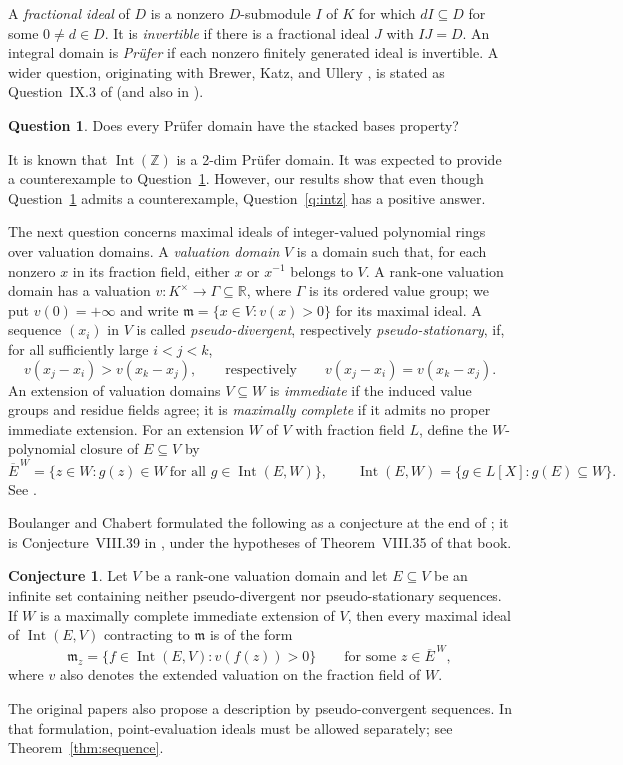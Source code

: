 \documentclass[11pt]{amsart}
\theoremstyle{definition}
\newtheorem{question}[theorem]{Question}
\newtheorem{conjecture}[theorem]{Conjecture}
\theoremstyle{remark}
\newcommand{\Int}{\operatorname{Int}}
\begin{document}
A \emph{fractional ideal} of $D$ is a nonzero $D$-submodule $I$ of $K$
for which $dI\subseteq D$ for some $0\ne d\in D$. It is
\emph{invertible} if there is a fractional ideal $J$ with $IJ=D$.
An integral domain is
\emph{Pr\"ufer} if each nonzero finitely generated ideal is invertible.
A wider question, originating with Brewer, Katz, and Ullery
\cite{BKU1987}, is stated as Question~IX.3 of \cite{Chabert2025}
(and also in \cite[\S1]{BoulangerChabert2020}).
\begin{question}\label{q:prufer}
Does every Pr\"ufer domain have the stacked bases property?
\end{question}

It is known that $\Int(\mathbb Z)$ is a 2-dim Pr\"ufer domain. It was expected to provide a counterexample to Question~\ref{q:prufer}.
However, our results show that even though Question~\ref{q:prufer} admits a counterexample, Question~\ref{q:intz} has a positive answer.

The next question concerns maximal ideals of integer-valued polynomial
rings over valuation domains. A \emph{valuation domain} $V$ is a domain
such that, for each nonzero $x$ in its fraction field, either $x$ or
$x^{-1}$ belongs to $V$. A rank-one valuation domain has a valuation
$v:K^\times\to\Gamma\subseteq\mathbb R$, where $\Gamma$ is its
ordered value group; we put $v(0)=+\infty$ and write
$\mathfrak m=\{x\in V:v(x)>0\}$ for its maximal ideal.
A sequence $(x_i)$ in $V$ is called \emph{pseudo-divergent}, respectively
\emph{pseudo-stationary}, if, for all sufficiently large $i<j<k$,
\[
 v(x_j-x_i)>v(x_k-x_j),\qquad\text{respectively}\qquad
 v(x_j-x_i)=v(x_k-x_j).
\]
An extension of valuation domains $V\subseteq W$ is \emph{immediate}
if the induced value groups and residue fields agree; it is
\emph{maximally complete} if it admits no proper immediate extension.
For an extension $W$ of $V$ with fraction field $L$, define the
$W$-polynomial closure of $E\subseteq V$ by
\[
 \overline E^{\,W}
 =\{z\in W:g(z)\in W\ \text{for all }g\in\Int(E,W)\},\qquad
 \Int(E,W)=\{g\in L[X]:g(E)\subseteq W\}.
\]
See \cite[Definition~VII.1]{Chabert2025}.

Boulanger and Chabert formulated the following as a
conjecture at the end of \cite[\S3]{BoulangerChabert2020}; it is
Conjecture~VIII.39 in \cite{Chabert2025}, under the hypotheses of
Theorem~VIII.35 of that book.
\begin{conjecture}\label{c:maxideal}
Let $V$ be a rank-one valuation domain and let $E\subseteq V$ be an
infinite set containing neither pseudo-divergent nor pseudo-stationary
sequences. If $W$ is a maximally complete immediate extension of $V$,
then every maximal ideal of $\Int(E,V)$ contracting to $\mathfrak m$
is of the form
\[
 \mathfrak m_z=\{f\in\Int(E,V):v(f(z))>0\}
 \qquad\text{for some }z\in\overline E^{\,W},
\]
where $v$ also denotes the extended valuation on the fraction field
of $W$.
\end{conjecture}
The original papers also propose a description by pseudo-convergent
sequences. In that formulation, point-evaluation ideals must be
allowed separately; see Theorem~\ref{thm:sequence}.
\end{document}
